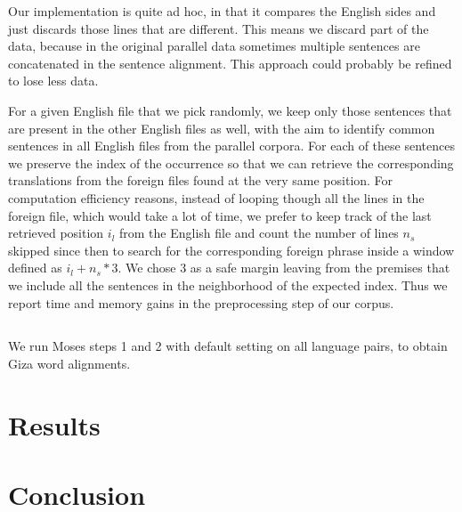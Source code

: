 \documentclass[11pt]{article}
\begin{document}
Our implementation is quite ad hoc, in that it compares the English sides and just discards those lines that are different. This means we discard part of the data, because in the original parallel data sometimes multiple sentences are concatenated in the sentence alignment. This approach could probably be refined to lose less data. 

For a given English file that we pick randomly, we keep only those sentences that are present in the other English files as well, with the aim to identify common sentences in all English files from the parallel corpora. For each of these sentences we preserve the index of the occurrence so that we can retrieve the corresponding translations from the foreign files found at the very same position. For computation efficiency reasons, instead of looping though all the lines in the foreign file, which would take a lot of time, we prefer to keep track of the last retrieved position $i_l$ from the English file and count the number of lines $n_s$ skipped since then to search for the corresponding foreign phrase inside a window defined as $i_l+n_s*3$. We chose 3 as a safe margin leaving from the premises that we include all the sentences in the neighborhood of the expected index. Thus we report time and memory gains in the preprocessing step of our corpus.


\subsection{}

We run Moses steps 1 and 2 with default setting on all language pairs, to obtain Giza word alignments. 


\section{Results}




\section{Conclusion}
\end{document}
